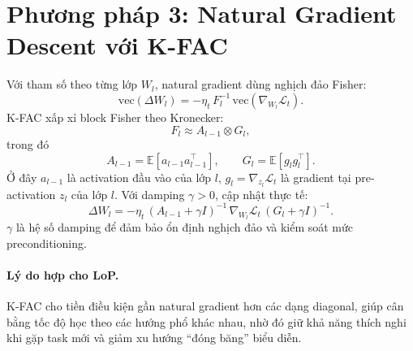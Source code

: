 \documentclass[11pt]{article}
\newcommand{\E}{\mathbb{E}}
\begin{document}
\section{Phương pháp 3: Natural Gradient Descent với K-FAC}
Với tham số theo từng lớp $W_l$, natural gradient dùng nghịch đảo Fisher:
\begin{equation}
\mathrm{vec}(\Delta W_l) = -\eta_t \, F_l^{-1}\,\mathrm{vec}(\nabla_{W_l}\mathcal{L}_t).
\end{equation}
K-FAC xấp xỉ block Fisher theo Kronecker:
\begin{equation}
F_l \approx A_{l-1} \otimes G_l,
\end{equation}
trong đó
\begin{equation}
A_{l-1}=\E[a_{l-1}a_{l-1}^\top],\qquad G_l=\E[g_l g_l^\top].
\end{equation}
Ở đây $a_{l-1}$ là activation đầu vào của lớp $l$, $g_l=\nabla_{z_l}\mathcal{L}_t$ là gradient tại pre-activation $z_l$ của lớp $l$.
Với damping $\gamma>0$, cập nhật thực tế:
\begin{equation}
\Delta W_l = -\eta_t\,(A_{l-1}+\gamma I)^{-1}\,\nabla_{W_l}\mathcal{L}_t\,(G_l+\gamma I)^{-1}.
\end{equation}
$\gamma$ là hệ số damping để đảm bảo ổn định nghịch đảo và kiểm soát mức preconditioning.

\paragraph{Lý do hợp cho LoP.}
K-FAC cho tiền điều kiện gần natural gradient hơn các dạng diagonal, giúp cân bằng tốc độ học theo các hướng phổ khác nhau, nhờ đó giữ khả năng thích nghi khi gặp task mới và giảm xu hướng “đóng băng” biểu diễn.
\end{document}
